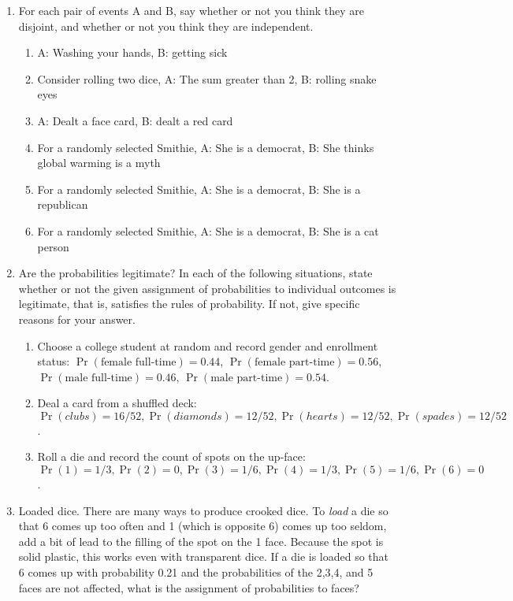 \documentclass[10pt]{article}\usepackage[]{graphicx}\usepackage[]{color}
\begin{document}
\begin{enumerate}
  \itemsep0.5in
  \item For each pair of events A and B, say whether or not you think they are disjoint, and whether or not you think they are independent.
    \begin{enumerate}
      \itemsep0.40in
      \item A: Washing your hands, B: getting sick
      \item Consider rolling two dice, A: The sum greater than 2, B: rolling snake eyes
      \item A: Dealt a face card, B: dealt a red card
      \item For a randomly selected Smithie, A: She is a democrat, B: She thinks global warming is a myth
      \item For a randomly selected Smithie, A: She is a democrat, B: She is a republican
      \item For a randomly selected Smithie, A: She is a democrat, B: She is a cat person
\end{enumerate}

  \item 
  Are the probabilities legitimate?
  In each of the following situations, state whether or not the given assignment of probabilities to individual outcomes is legitimate, that is, satisfies the rules of probability. If not, give specific reasons for your answer.
  \begin{enumerate}
    \itemsep0.5in
    \item Choose a college student at random and record gender and enrollment status: $\Pr(\text{female full-time}) = 0.44$, $\Pr(\text{female part-time}) = 0.56$, $\Pr(\text{male full-time}) = 0.46$, $\Pr(\text{male part-time}) = 0.54$.
    \item Deal a card from a shuffled deck: $\Pr(clubs) = 16/52, \Pr(diamonds) = 12/52, \Pr(hearts) = 12/52, \Pr(spades) = 12/52$. 
    \item Roll a die and record the count of spots on the up-face: $\Pr(1) = 1/3, \Pr(2) = 0, \Pr(3) = 1/6, \Pr(4) =1/3, \Pr(5) = 1/6, \Pr(6) = 0$. 
  \end{enumerate}
  \vspace{-0.5in}
  \item 
  Loaded dice. There are many ways to produce crooked dice. To \emph{load} a die so that 6 comes up too often and 1 (which is opposite 6) comes up too seldom, add a bit of lead to the filling of the spot on the 1 face. Because the spot is solid plastic, this works even with transparent dice. If a die is loaded so that 6 comes up with probability 0.21 and the probabilities of the 2,3,4, and 5 faces are not affected, what is the assignment of probabilities to faces? 


\end{enumerate}
\end{document}
